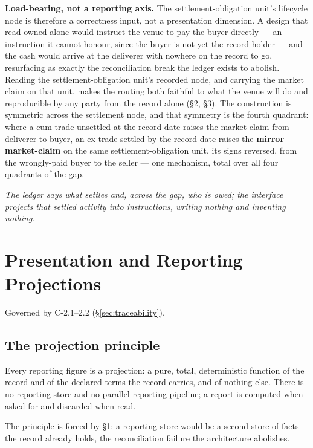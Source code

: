 \documentclass[11pt,a4paper]{article}
\begin{document}
\medskip\noindent\textbf{Load-bearing, not a reporting axis.} The settlement-obligation
unit's lifecycle node is therefore a correctness input, not a presentation dimension. A
design that read owned alone would instruct the venue to pay the buyer directly --- an
instruction it cannot honour, since the buyer is not yet the record holder --- and the
cash would arrive at the deliverer with nowhere on the record to go, resurfacing as
exactly the reconciliation break the ledger exists to abolish. Reading the
settlement-obligation unit's recorded node, and carrying the market claim on that unit,
makes the routing both faithful to what the venue will do and reproducible by any party
from the record alone (\S2, \S3). The construction is symmetric across the settlement
node, and that symmetry is the fourth quadrant: where a cum trade unsettled at the record
date raises the market claim from deliverer to buyer, an ex trade settled by the record
date raises the \textbf{mirror market-claim} on the same settlement-obligation unit, its
signs reversed, from the wrongly-paid buyer to the seller --- one mechanism, total over
all four quadrants of the gap.

\emph{The ledger says what settles and, across the gap, who is owed; the interface
projects that settled activity into instructions, writing nothing and inventing
nothing.}

\section{Presentation and Reporting Projections}\label{ch:reporting}

Governed by C-2.1--2.2 (\S\ref{sec:traceability}).

\subsection{The projection principle}

Every reporting figure is a projection: a pure, total, deterministic function of
the record and of the declared terms the record carries, and of nothing else.
There is no reporting store and no parallel reporting pipeline; a report is
computed when asked for and discarded when read.

The principle is forced by \S 1: a reporting store would be a second store of facts the record
already holds, the reconciliation failure the architecture abolishes.
\end{document}
